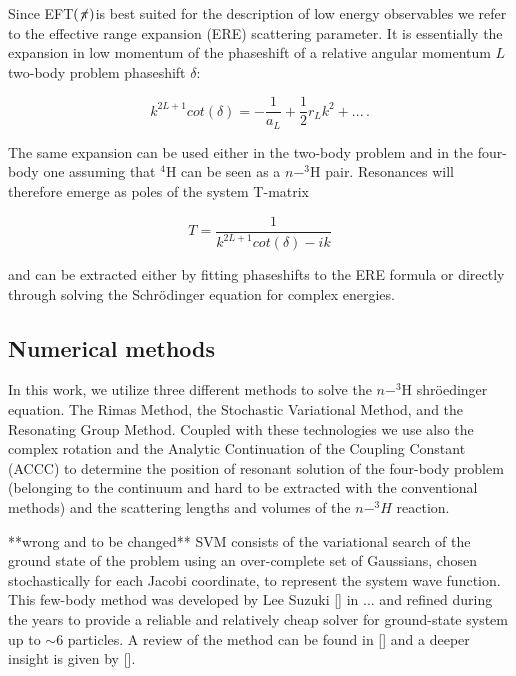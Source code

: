 \documentclass[aps,onecolumn,preprintnumbers,amsmath,amssymb,nofootinbib,superscriptaddress,notitlepage]{revtex4-1}
\newcommand{\eftnopi}{\mbox{EFT$(\not \! \pi)$}}
\begin{document}
%
Since \eftnopi is best suited for the description of low energy observables we refer to the effective range expansion (ERE) scattering parameter. 
It is essentially the expansion in low momentum of the phaseshift of a relative angular momentum $L$ two-body problem phaseshift $\delta$:

\begin{equation}
    k^{2L+1}cot(\delta)=-\frac{1}{a_L}+\frac{1}{2}r_L k^2 + ... \, .
\end{equation}

The same expansion can be used either in the two-body problem and in the four-body one assuming that $^4$H can be seen as a $n-^3$H pair.
Resonances will therefore emerge as poles of the system T-matrix

\begin{equation}
T = \frac{1}{k^{2L+1}cot(\delta)-ik}    
\end{equation}

and can be extracted either by fitting phaseshifts to the ERE formula or directly through solving the Schr\"odinger equation for complex energies. 




\subsection*{Numerical methods}

In this work, we utilize three different methods to solve the $n-^3$H shr\"oedinger equation.
The Rimas Method, the Stochastic Variational Method, and the Resonating Group Method. 
Coupled with these technologies we use also the complex rotation and the Analytic Continuation of the Coupling Constant (ACCC) to determine the position of resonant solution of the four-body problem (belonging to the continuum and hard to be extracted with the conventional methods) and the scattering lengths and volumes of the $n-^3H$ reaction. 

**wrong and to be changed** 
SVM consists of the variational search of the ground state of the problem using an over-complete set of Gaussians, chosen stochastically for each Jacobi coordinate, to represent the system wave function. 
This few-body method was developed by Lee Suzuki [] in ... and refined during the years to provide a reliable and relatively cheap solver for ground-state system up to $\sim 6$ particles.
A review of the method can be found in [] and a deeper insight is given by [].

%
%
%
%
\end{document}

